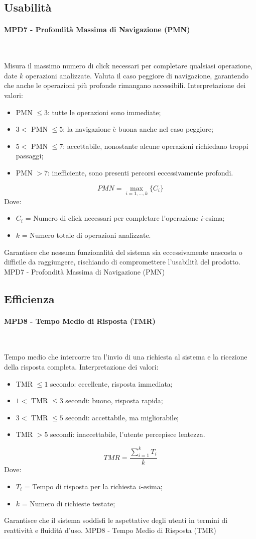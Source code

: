 \documentclass[10pt, letterpaper]{article}
\newcommand{\trisubsection}[1]{\paragraph{#1}\mbox{}\\}
\begin{document}
\subsection{Usabilità}
\trisubsection{MPD7 - Profondità Massima di Navigazione (PMN)}
{Misura il massimo numero di click necessari per completare qualsiasi operazione, date $k$ operazioni analizzate.
    Valuta il caso peggiore di navigazione, garantendo che anche le operazioni
    più profonde rimangano accessibili.
    Interpretazione dei valori:
    \begin{itemize}
        \item PMN $\leq 3$: tutte le operazioni sono immediate;
        \item $3 < $ PMN $ \leq 5$: la navigazione è buona anche nel caso peggiore;
        \item $5 < $ PMN $ \leq 7$: accettabile, nonostante alcune operazioni richiedano troppi passaggi;
        \item PMN $> 7$: inefficiente, sono presenti percorsi eccessivamente profondi.
    \end{itemize}}
{\[ PMN = \max_{i=1,\dots,k} \{C_i\} \]
    Dove:
    \begin{itemize}
        \item $C_{i}$ = Numero di click necessari per completare l'operazione $i$-esima;
        \item $k$ = Numero totale di operazioni analizzate.
    \end{itemize}}
{Garantisce che nessuna funzionalità del sistema sia eccessivamente nascosta
    o difficile da raggiungere, rischiando di compromettere l'usabilità del prodotto.}
{MPD7 - Profondità Massima di Navigazione (PMN)}

\subsection{Efficienza}
\trisubsection{MPD8 - Tempo Medio di Risposta (TMR)}
{Tempo medio che intercorre tra l'invio di una richiesta al sistema
    e la ricezione della risposta completa.
    Interpretazione dei valori:
    \begin{itemize}
        \item TMR $\leq 1$ secondo: eccellente, risposta immediata;
        \item $1 < $ TMR $ \leq 3$ secondi: buono, risposta rapida;
        \item $3 < $ TMR $ \leq 5$ secondi: accettabile, ma migliorabile;
        \item TMR $> 5$ secondi: inaccettabile, l'utente percepisce lentezza.
    \end{itemize}}
{\[ TMR = \frac{\sum_{i=1}^{k} T_i}{k} \]
    Dove:
    \begin{itemize}
        \item $T_{i}$ = Tempo di risposta per la richiesta $i$-esima;
        \item $k$ = Numero di richieste testate;
    \end{itemize}
}
{Garantisce che il sistema soddisfi le aspettative degli utenti in termini di
    reattività e fluidità d'uso.}
{MPD8 - Tempo Medio di Risposta (TMR)}
\end{document}
